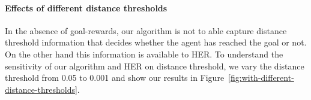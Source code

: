 \paragraph{Effects of different distance thresholds}

In the absence of goal-rewards, our algorithm is not to able capture distance
threshold information that decides whether the agent has reached the goal or
not. On the other hand this information is available to HER. To understand the
sensitivity of our algorithm and HER on distance threshold, we vary the distance
threshold from 0.05 to 0.001 and show our results in
Figure~\ref{fig:with-different-distance-thresholds}.



